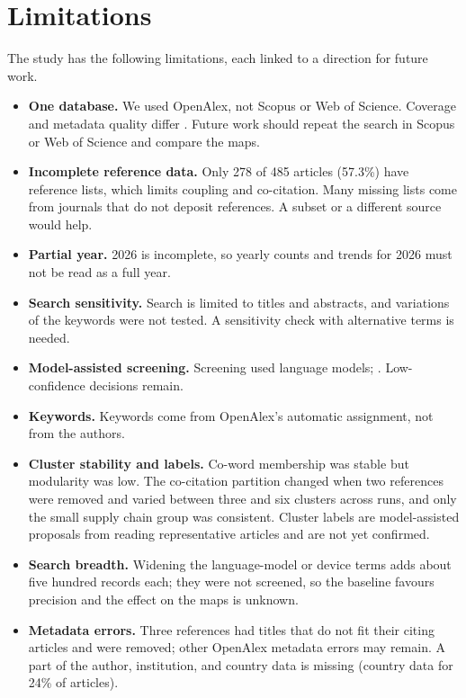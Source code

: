 \section{Limitations}
\label{sec:limitations}
The study has the following limitations, each linked to a direction for future work.
\begin{itemize}
  \item \textbf{One database.} We used OpenAlex, not Scopus or Web of Science. Coverage and metadata quality differ . Future work should repeat the search in Scopus or Web of Science and compare the maps.
  \item \textbf{Incomplete reference data.} Only 278 of 485 articles (57.3\%) have reference lists, which limits coupling and co-citation. Many missing lists come from journals that do not deposit references. A subset or a different source would help.
  \item \textbf{Partial year.} 2026 is incomplete, so yearly counts and trends for 2026 must not be read as a full year.
  \item \textbf{Search sensitivity.} Search is limited to titles and abstracts, and variations of the keywords were not tested. A sensitivity check with alternative terms is needed.
  \item \textbf{Model-assisted screening.} Screening used language models; . Low-confidence decisions remain.
  \item \textbf{Keywords.} Keywords come from OpenAlex's automatic assignment, not from the authors.
  \item \textbf{Cluster stability and labels.} Co-word membership was stable but modularity was low. The co-citation partition changed when two references were removed and varied between three and six clusters across runs, and only the small supply chain group was consistent. Cluster labels are model-assisted proposals from reading representative articles and are not yet confirmed.
  \item \textbf{Search breadth.} Widening the language-model or device terms adds about five hundred records each; they were not screened, so the baseline favours precision and the effect on the maps is unknown.
  \item \textbf{Metadata errors.} Three references had titles that do not fit their citing articles and were removed; other OpenAlex metadata errors may remain. A part of the author, institution, and country data is missing (country data for 24\% of articles).
\end{itemize}

